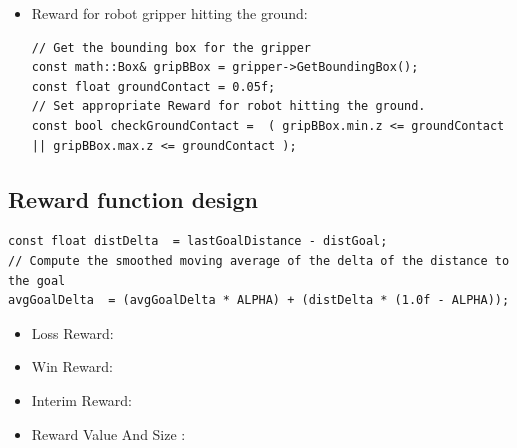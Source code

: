\documentclass[10pt,journal,compsoc]{IEEEtran}
\begin{document}
\begin{itemize}
\item Reward for robot gripper hitting the ground:
\begin{lstlisting}
// Get the bounding box for the gripper		
const math::Box& gripBBox = gripper->GetBoundingBox();
const float groundContact = 0.05f;
// Set appropriate Reward for robot hitting the ground.
const bool checkGroundContact =  ( gripBBox.min.z <= groundContact || gripBBox.max.z <= groundContact );
\end{lstlisting}
\end {itemize}

\subsection{Reward function design}

\begin{lstlisting}
const float distDelta  = lastGoalDistance - distGoal;
// Compute the smoothed moving average of the delta of the distance to the goal
avgGoalDelta  = (avgGoalDelta * ALPHA) + (distDelta * (1.0f - ALPHA));
\end{lstlisting}

\begin{itemize}
\item Loss Reward:
\item Win Reward:
\item Interim Reward:
\item Reward Value And Size :
\end {itemize}
\end{document}
